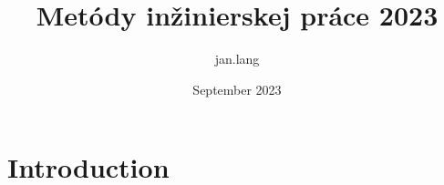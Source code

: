\documentclass{article}
\title{Metódy inžinierskej práce 2023}
\author{jan.lang }
\date{September 2023}
\begin{document}
\maketitle

\section{Introduction}
\Blinddocument
\end{document}
